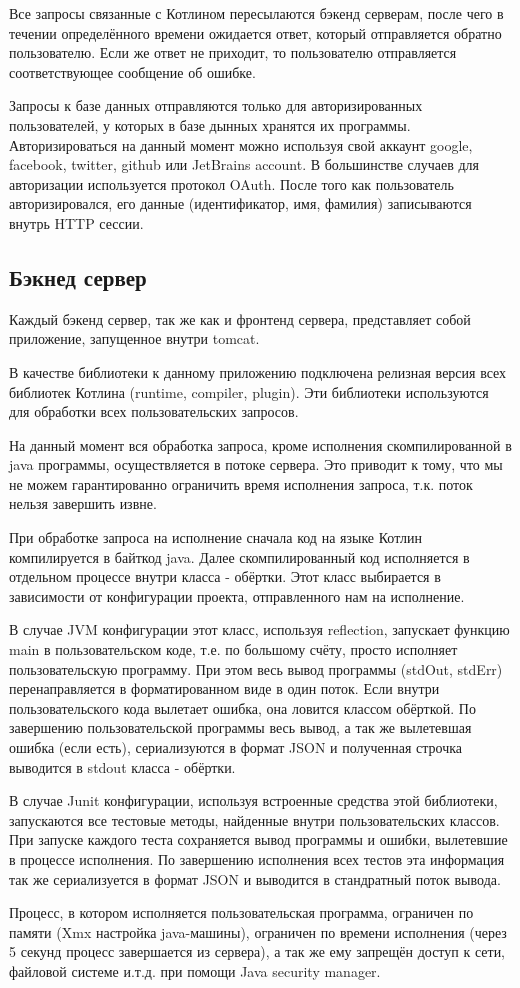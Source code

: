 	Все запросы связанные с Котлином пересылаются бэкенд серверам, после чего в течении определённого времени ожидается ответ, который отправляется обратно пользователю. Если же ответ не приходит, то пользователю отправляется соответствующее сообщение об ошибке.
	
	Запросы к базе данных отправляются только для авторизированных пользователей, у которых в базе дынных хранятся их программы. Авторизироваться на данный момент можно используя свой аккаунт google, facebook, twitter, github или JetBrains account. В большинстве случаев для авторизации используется протокол OAuth. После того как пользователь авторизировался, его данные (идентификатор, имя, фамилия) записываются внутрь HTTP сессии. 

\subsection{Бэкнед сервер}
	Каждый бэкенд сервер, так же как и фронтенд сервера, представляет собой приложение, запущенное внутри tomcat. 
	
	В качестве библиотеки к данному приложению подключена релизная версия всех библиотек Котлина (runtime, compiler, plugin). Эти библиотеки используются для обработки всех пользовательских запросов.
	
	На данный момент вся обработка запроса, кроме исполнения скомпилированной в java программы, осуществляется в потоке сервера. Это приводит к тому, что мы не можем гарантированно ограничить время исполнения запроса, т.к. поток нельзя завершить извне.
	
	При обработке запроса на исполнение сначала код на языке Котлин компилируется в байткод java. Далее скомпилированный код исполняется в отдельном процессе внутри класса - обёртки. Этот класс выбирается в зависимости от конфигурации проекта, отправленного нам на исполнение.
	
	В случае JVM конфигурации этот класс, используя reflection, запускает функцию main в пользовательском коде, т.е. по большому счёту, просто исполняет пользовательскую программу. При этом весь вывод программы (stdOut, stdErr) перенаправляется в форматированном виде в один поток. Если внутри пользовательского кода вылетает ошибка, она ловится классом обёрткой. По завершению пользовательской программы весь вывод, а так же вылетевшая ошибка (если есть), сериализуются в формат JSON и полученная строчка выводится в stdout класса - обёртки.
	
	В случае Junit конфигурации, используя встроенные средства этой библиотеки, запускаются все тестовые методы, найденные внутри пользовательских классов. При запуске каждого теста сохраняется вывод программы и ошибки, вылетевшие в процессе исполнения. По завершению исполнения всех тестов эта информация так же сериализуется в формат JSON и выводится в стандратный поток вывода.
	
	Процесс, в котором исполняется пользовательская программа, ограничен по памяти (Xmx настройка java-машины), ограничен по времени исполнения (через 5 секунд процесс завершается из сервера), а так же ему запрещён доступ к сети, файловой системе и.т.д. при помощи Java security manager.
	
	
	